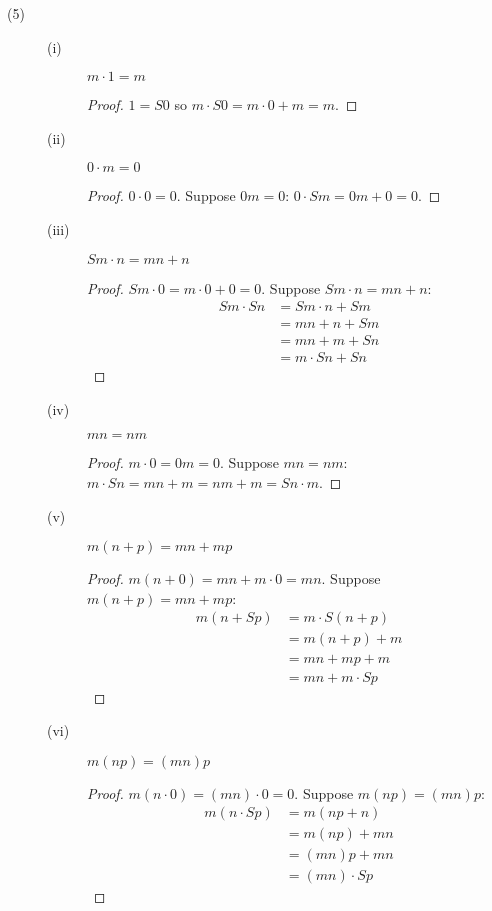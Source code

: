 \documentclass[12pt]{article}
\begin{document}
\begin{description}
\item[(5)]
  \begin{description}
    \item[(i)] $m \cdot 1 = m$
	  \begin{proof}
	    $1 = S0$ so $m \cdot S0 = m \cdot 0 + m = m$.
	  \end{proof}
	\item[(ii)] $0 \cdot m = 0$
	  \begin{proof}
	    $0 \cdot 0 = 0$.  Suppose $0m=0$: $0 \cdot Sm = 0m + 0 = 0$.
	  \end{proof}
	\item[(iii)] $Sm \cdot n = mn + n$
	  \begin{proof}
	    $Sm \cdot 0 = m \cdot 0 + 0 = 0$.  Suppose $Sm \cdot n = mn +
		n$:
		\begin{align*}
		  Sm \cdot Sn &= Sm \cdot n + Sm \\
		              &= mn + n + Sm \\
					  &= mn + m + Sn \\
		              &= m \cdot Sn + Sn
		\end{align*}
	  \end{proof}
	\item[(iv)] $mn = nm$
	  \begin{proof}
	    $m \cdot 0 = 0m = 0$.  Suppose $mn = nm$: $m \cdot Sn = mn + m =
		nm + m = Sn \cdot m$.
	  \end{proof}
	\item[(v)] $m(n+p) = mn + mp$
	  \begin{proof}
	    $m(n+0) = mn + m\cdot0 = mn$.  Suppose $m(n+p) = mn + mp$:
		\begin{align*}
		  m(n+Sp) &= m \cdot S(n+p) \\
		          &= m(n+p) + m \\
				  &= mn + mp + m \\
				  &= mn + m \cdot Sp
		\end{align*}
	  \end{proof}
	\item[(vi)] $m(np) = (mn)p$
	  \begin{proof}
	    $m(n \cdot 0) = (mn) \cdot 0 = 0$.  Suppose $m(np) = (mn)p$:
		\begin{align*}
		  m(n \cdot Sp) &= m(np+n) \\
		                &= m(np) + mn \\
						&= (mn)p + mn \\
						&= (mn) \cdot Sp
		\end{align*}
	  \end{proof}
  \end{description}


\end{description}
\end{document}
